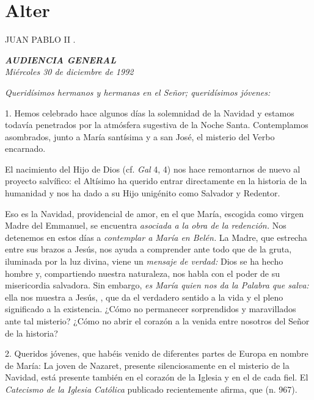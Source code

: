\section{Alter} JUAN PABLO II .

\emph{\textbf{AUDIENCIA GENERAL}}\\[2\baselineskip]\emph{Miércoles 30 de diciembre de 1992}



\emph{Queridísimos hermanos y hermanas en el Señor; queridísimos jóvenes:}

1. Hemos celebrado hace algunos días la solemnidad de la Navidad y estamos todavía penetrados por la atmósfera sugestiva de la Noche Santa. Contemplamos asombrados, junto a María santísima y a san José, el misterio del Verbo encarnado.

El nacimiento del Hijo de Dios  (cf. \emph{Gal} 4, 4) nos hace remontarnos de nuevo al proyecto salvífico: el Altísimo ha querido entrar directamente en la historia de la humanidad y nos ha dado a su Hijo unigénito como Salvador y Redentor.

Eso es la Navidad,  providencial de amor, en el que María, escogida como virgen Madre del Emmanuel, se encuentra \emph{asociada a la obra de la redención.} Nos detenemos en estos días a \emph{contemplar a María en Belén.} La Madre, que estrecha entre sus brazos a Jesús, nos ayuda a comprender ante todo que de la gruta, iluminada por la luz divina, viene un \emph{mensaje de verdad:} Dios se ha hecho hombre y, compartiendo nuestra naturaleza, nos habla con el poder de su misericordia salvadora. Sin embargo, \emph{es María quien nos da la Palabra que salva:} ella nos muestra a Jesús, , que da el verdadero sentido a la vida y el pleno significado a la existencia. ¿Cómo no permanecer sorprendidos y maravillados ante tal misterio? ¿Cómo no abrir el corazón a la venida entre nosotros del Señor de la historia?

2. Queridos jóvenes, que habéis venido de diferentes partes de Europa en nombre de María: La joven de Nazaret, presente silenciosamente en el misterio de la Navidad, está presente también en el corazón de la Iglesia y en el de cada fiel. El \emph{Catecismo de la Iglesia Católica} publicado recientemente afirma, que  (n. 967).

